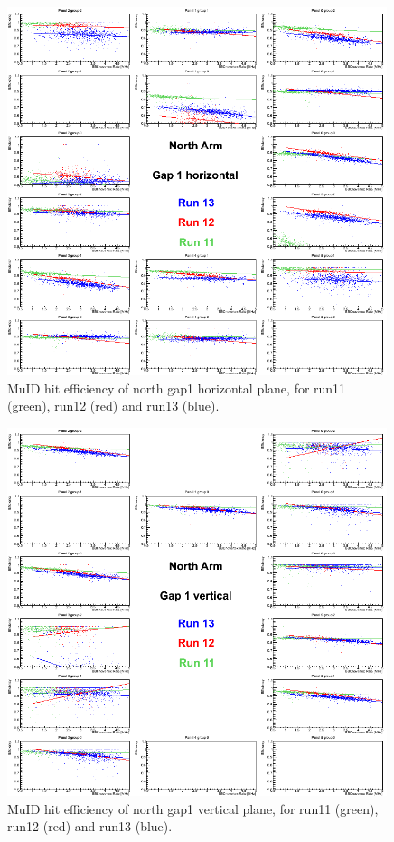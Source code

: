 \clearpage
\begin{center}
  \begin{figure}[p]
    \includegraphics[width=0.99\textwidth]{./figures/efficomp_North_gap1_horizontal.png}
    \caption{\label{Fig:efficiency:MuIdEff:a1g1p0}MuID hit efficiency of north gap1 horizontal plane, for run11 (green), run12 (red) and run13 (blue).}
  \end{figure}
\end{center}
\begin{center}
  \begin{figure}[p]
    \includegraphics[width=0.99\textwidth]{./figures/efficomp_North_gap1_vertical.png}
    \caption{\label{Fig:efficiency:MuIdEff:a1g1p1}MuID hit efficiency of north gap1 vertical plane, for run11 (green), run12 (red) and run13 (blue).}
  \end{figure}
\end{center}
